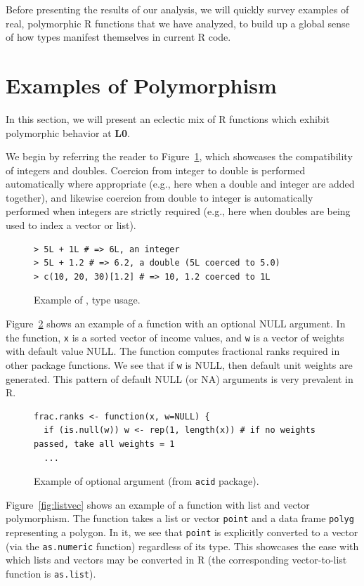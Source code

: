 \documentclass[acmsmall,10pt,review,anonymous]{acmart}\settopmatter{printfolios=true,printccs=false,printacmref=false}
\newcommand{\code}[1]{\lstinline|#1|\xspace}
\begin{document}
Before presenting the results of our analysis, we will quickly survey examples of real, polymorphic R functions that we have analyzed, to build up a global sense of how types manifest themselves in current R code.


%
%
%
%
%
%
\section{Examples of Polymorphism}
\label{sec:polyex}

In this section, we will present an eclectic mix of R functions which exhibit polymorphic behavior at {\bf L0}.

We begin by referring the reader to Figure~\ref{fig:realex}, which showcases the compatibility of integers and doubles.
Coercion from integer to double is performed automatically where appropriate (e.g., here when a double and integer are added together), and likewise coercion from double to integer is automatically performed when integers are strictly required (e.g., here when doubles are being used to index a vector or list).

\begin{figure}[!hb]{\small\begin{lstlisting}[style=R]
> 5L + 1L # => 6L, an integer
> 5L + 1.2 # => 6.2, a double (5L coerced to 5.0)
> c(10, 20, 30)[1.2] # => 10, 1.2 coerced to 1L
\end{lstlisting}}\caption{Example of \sD, \sI type usage.}\label{fig:realex}\end{figure}

Figure~\ref{fig:optnull} shows an example of a function with an optional NULL argument. 
In the function, {\tt x} is a sorted vector of income values, and {\tt w} is a vector of weights with default value NULL.
The function computes fractional ranks required in other package functions.
We see that if {\tt w} is NULL, then default unit weights are generated.
This pattern of default NULL (or NA) arguments is very prevalent in R.

\begin{figure}[!hb]{\small\begin{lstlisting}[style=R]
frac.ranks <- function(x, w=NULL) {
  if (is.null(w)) w <- rep(1, length(x)) # if no weights passed, take all weights = 1
  ...
\end{lstlisting}}\caption{Example of optional argument (from {\tt acid} package).}\label{fig:optnull}\end{figure}

Figure~\ref{fig:listvec} shows an example of a function with list and vector
polymorphism.  The function takes a list or vector {\tt point} and a data
frame {\tt polyg} representing a polygon.  In it, we see that {\tt point} is explicitly converted
to a vector (via the \code{as.numeric} function) regardless of its type.
This showcases the ease with which lists and vectors may be converted in R (the corresponding vector-to-list function is \code{as.list}).
\end{document}
